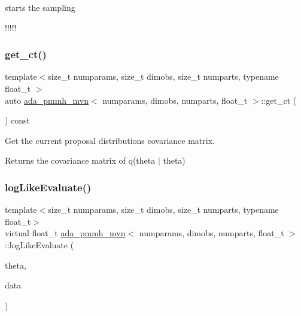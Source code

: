 starts the sampling 

!!!!! \mbox{\label{classada__pmmh__mvn_a06930a79f4d2a62aa0cf24528c77e5a7}} 
\subsubsection{\texorpdfstring{get\+\_\+ct()}{get\_ct()}}
{\footnotesize\ttfamily template$<$size\+\_\+t numparams, size\+\_\+t dimobs, size\+\_\+t numparts, typename float\+\_\+t $>$ \\
auto \hyperlink{classada__pmmh__mvn}{ada\+\_\+pmmh\+\_\+mvn}$<$ numparams, dimobs, numparts, float\+\_\+t $>$\+::get\+\_\+ct (\begin{DoxyParamCaption}{ }\end{DoxyParamCaption}) const}



Get the current proposal distribution\textquotesingle{}s covariance matrix. 

\begin{DoxyReturn}{Returns}
the covariance matrix of q(theta\textquotesingle{} $\vert$ theta) 
\end{DoxyReturn}
\mbox{\label{classada__pmmh__mvn_a82d43085173fd0ed33ee42de9be48b77}} 
\subsubsection{\texorpdfstring{log\+Like\+Evaluate()}{logLikeEvaluate()}}
{\footnotesize\ttfamily template$<$size\+\_\+t numparams, size\+\_\+t dimobs, size\+\_\+t numparts, typename float\+\_\+t$>$ \\
virtual float\+\_\+t \hyperlink{classada__pmmh__mvn}{ada\+\_\+pmmh\+\_\+mvn}$<$ numparams, dimobs, numparts, float\+\_\+t $>$\+::log\+Like\+Evaluate (\begin{DoxyParamCaption}\item[{const \hyperlink{classparamPack}{param\+Pack}$<$ float\+\_\+t $>$ \&}]{theta,  }\item[{const std\+::vector$<$ osv $>$ \&}]{data }\end{DoxyParamCaption})\hspace{0.3cm}{\ttfamily [pure virtual]}}



